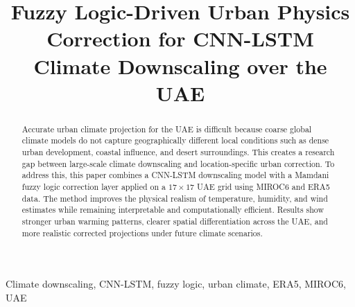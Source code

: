 \documentclass[conference]{IEEEtran}
\begin{document}
\title{Fuzzy Logic-Driven Urban Physics Correction for CNN-LSTM Climate Downscaling over the UAE}

\author{

\vspace{0.6cm}

}

\maketitle

\begin{abstract}
Accurate urban climate projection for the UAE is difficult because coarse global climate models do not capture geographically different local conditions such as dense urban development, coastal influence, and desert surroundings. This creates a research gap between large-scale climate downscaling and location-specific urban correction. To address this, this paper combines a CNN-LSTM downscaling model with a Mamdani fuzzy logic correction layer applied on a \(17\times17\) UAE grid using MIROC6 and ERA5 data. The method improves the physical realism of temperature, humidity, and wind estimates while remaining interpretable and computationally efficient. Results show stronger urban warming patterns, clearer spatial differentiation across the UAE, and more realistic corrected projections under future climate scenarios.
\end{abstract}

\begin{IEEEkeywords}
Climate downscaling, CNN-LSTM, fuzzy logic, urban climate, ERA5, MIROC6, UAE
\end{IEEEkeywords}
\end{document}
